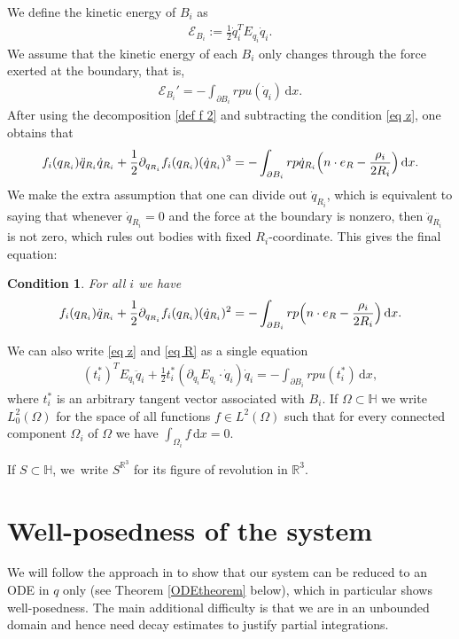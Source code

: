 \documentclass[10pt]{amsart}
\newtheorem{condition}[theorem]{Condition}
\theoremstyle{definition}
\newcommand\R{\mathbb{R}}
\newcommand\eq{=}
\newcommand\dd{\,\mathrm{d}}
\newcommand\dx{\dd x}
\let\de\partial
\begin{document}
We define the kinetic energy of $B_i$ as
\begin{align}\label{intEnergy}
\mathcal{E}_{B_i}:=\frac{1}{2}\dot{q}_i^TE_{q_i}\dot{q}_i.
\end{align}
We assume that the kinetic energy of each $B_i$ only changes through the force exerted at the boundary, that is,
\begin{align}
\mathcal{E}_{B_i}'\eq-\int_{\de B_i} rpu(\dot{q}_i)\dx.\label{energyBalance}
\end{align}
After using the decomposition \eqref{def f 2} and subtracting the condition \eqref{eq z}, one obtains that
\begin{align*}%
f_i(q_{R_i})\ddot{q}_{R_i}\dot{q}_{R_i}+\frac{1}{2}\de_{q_{R_i}}f_i(q_{R_i})(\dot{q}_{R_i})^3\eq -\int_{\de B_i}r p\dot{q}_{R_i}\Bigl(n\cdot e_R -\frac{\rho_i}{2R_i}\Bigr)\dx.
\end{align*}
We make the extra assumption that one can divide out $\dot{q}_{R_i}$, which is equivalent to saying that whenever $\dot{q}_{R_i}=0$ and the force at the boundary is nonzero, then $\ddot{q}_{R_i}$ is not zero, which rules out bodies with fixed $R_i$-coordinate. This gives the final equation:
\begin{condition}
For all $i$ we have
\begin{align}\label{eq R}
f_i(q_{R_i})\ddot{q}_{R_i}+\frac{1}{2}\de_{q_{R_i}}f_i(q_{R_i})(\dot{q}_{R_i})^2\eq -\int_{\de B_i}r p \Bigl(n\cdot e_R -\frac{\rho_i}{2R_i} \Bigr)\dx.
\end{align}
\end{condition}

We can also write \eqref{eq z} and \eqref{eq R} as a single equation
\begin{align}\label{2ndDeri}
(t_i^*)^TE_{q_i}\ddot{q}_i+\frac{1}{2}t_i^*(\de_{\dot{q}_i} E_{q_i}\cdot \dot{q}_i)\dot{q}_i\eq-\int_{\de B_i} rpu(t_i^*)\dx,
\end{align}
where $t_i^*$ is an arbitrary tangent vector associated with $B_i$.
If $\Omega\subset \mathbb{H}$ we write $L_0^2(\Omega)$ for the space of all functions $f\in L^2(\Omega)$ such that for every connected component $\Omega_i$ of $\Omega$ we have $\int_{\Omega_i}f\dx=0$.

If $S\subset \mathbb{H}$, we~write $S^{\R^3}$ for its figure of revolution in $\R^3$.
\section{Well-posedness of the system}\label{Section2}
We will follow the approach in \cite{GlassMunnierSueur2} to show that our system can be reduced to an ODE in $q$ only (see Theorem \ref{ODEtheorem} below), which in particular shows well-posedness. The main additional difficulty is that we are in an unbounded domain and hence need decay estimates to justify partial integrations.
\end{document}
